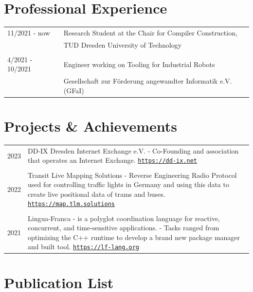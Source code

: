 \documentclass[11pt, a4paper, oneside]{report}
\begin{document}
\section*{Professional Experience}

\begin{tabular}{R{3cm} L{12cm}}
	11/2021 	- now			& Research Student at the Chair for Compiler Construction, \\ 
										& TUD Dresden University of Technology \\ 
										& 																			\\
	4/2021 - 10/2021    & Engineer working on Tooling for Industrial Robots \\ 
										& Gesellschaft zur Förderung angewandter Informatik e.V. (GFaI)
\end{tabular}

\section*{Projects \&  Achievements}

\begin{tabular}{R{3cm} L{13cm}}

	2023 							& DD-IX Dresden Internet Exchange e.V. - Co-Founding and association that operates an Internet Exchange.  \href{https://dd-ix.net}{\texttt{https://dd-ix.net}} \\ & \\
		2022 							&  Transit Live Mapping Solutions - Reverse Engineering Radio Protocol used for controlling traffic lights in Germany and using this data to create live positional data of trams and buses. \href{https://tlm.solutions}{\texttt{https://map.tlm.solutions}} \\  & \\
		2021 							& Lingua-Franca - is a polyglot coordination language for reactive, concurrent, and time-sensitive applications. - Tasks ranged from optimizing the C++ runtime to develop a brand new package manager and built tool. \href{https://lf-lang.org}{\texttt{https://lf-lang.org}}
\end{tabular}

\section*{Publication List}

\nocite{*} 
\printbibliography[heading=none]
\end{document}
